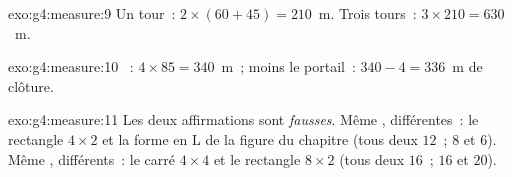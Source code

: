 \begin{solution}{exo:g4:measure:9}
Un tour~: $2 \times (60 + 45) = 210$~m. Trois tours~:
$3 \times 210 = 630$~m.
\end{solution}

\begin{solution}{exo:g4:measure:10}
~: $4 \times 85 = 340$~m~; moins le portail~:
$340 - 4 = 336$~m de clôture.
\end{solution}

\begin{solution}{exo:g4:measure:11}
Les deux affirmations sont \emph{fausses}. Même , 
différentes~: le rectangle $4 \times 2$ et la forme en L de la
figure du chapitre (tous deux  $12$~;  $8$ et $6$).
Même ,  différents~: le carré $4 \times 4$ et le
rectangle $8 \times 2$ (tous deux  $16$~;  $16$ et
$20$).
\end{solution}
